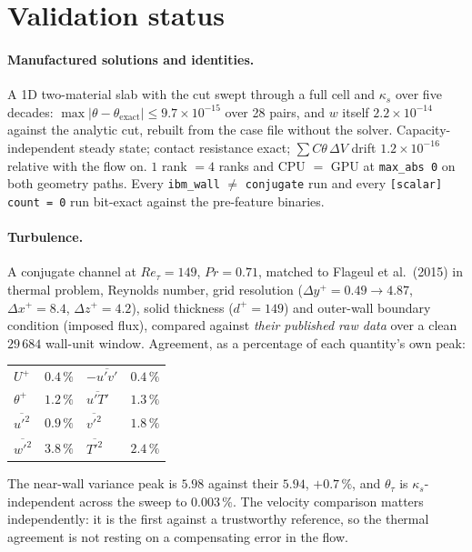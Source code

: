 \documentclass[11pt,a4paper]{article}
\newcommand{\code}[1]{\texttt{#1}}
\begin{document}
\section{Validation status}
\label{sec:validation}

\paragraph{Manufactured solutions and identities.}
A 1D two-material slab with the cut swept through a full cell and $\kappa_s$
over five decades: $\max|\theta-\theta_{\text{exact}}| \le 9.7\times10^{-15}$
over 28 pairs, and $w$ itself $2.2\times10^{-14}$ against the analytic cut,
rebuilt from the case file without the solver. Capacity-independent steady
state; contact resistance exact; $\sum C\theta\,\Delta V$ drift
$1.2\times10^{-16}$ relative with the flow on. $1$ rank $=4$ ranks and
CPU $=$ GPU at \code{max\_abs 0} on both geometry paths. Every
\code{ibm\_wall} $\ne$ \code{conjugate} run and every \code{[scalar] count = 0}
run bit-exact against the pre-feature binaries.

\paragraph{Turbulence.}
A conjugate channel at $Re_\tau=149$, $Pr=0.71$, matched to Flageul et al.\
(2015) in thermal problem, Reynolds number, grid resolution ($\Delta y^+ =
0.49\to4.87$, $\Delta x^+ = 8.4$, $\Delta z^+ = 4.2$), solid thickness
($d^+=149$) and outer-wall boundary condition (imposed flux), compared against
\emph{their published raw data} over a clean $29\,684$ wall-unit window.
Agreement, as a percentage of each quantity's own peak:
\begin{center}
\begin{tabular}{lclc}
\toprule
$U^+$ & $0.4\,\%$ & $-\overline{u'v'}$ & $0.4\,\%$ \\
$\theta^+$ & $1.2\,\%$ & $\overline{u'T'}$ & $1.3\,\%$ \\
$\overline{u'^2}$ & $0.9\,\%$ & $\overline{v'^2}$ & $1.8\,\%$ \\
$\overline{w'^2}$ & $3.8\,\%$ & $\overline{T'^2}$ & $2.4\,\%$ \\
\bottomrule
\end{tabular}
\end{center}
The near-wall variance peak is $5.98$ against their $5.94$, $+0.7\,\%$, and
$\theta_\tau$ is $\kappa_s$-independent across the sweep to $0.003\,\%$. The
velocity comparison matters independently: it is the first against a
trustworthy reference, so the thermal agreement is not resting on a
compensating error in the flow.
\end{document}
